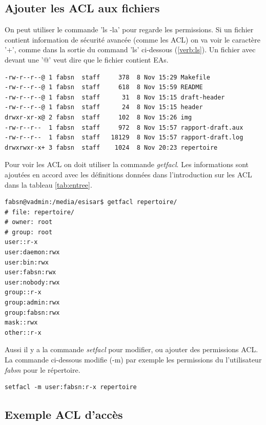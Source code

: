 \documentclass{article}
\begin{document}
\subsection*{Ajouter les ACL aux fichiers}

On peut utiliser le commande 'ls -la' pour regarde les permissions. Si un fichier contient information de sécurité avancée (comme les ACL) on va voir le caractère '+', comme dans la sortie du command 'ls' ci-dessous (\ref{verb:ls}). Un fichier avec devant une '@' veut dire que le fichier contient EAs. 

\begin{center}
\label{verb:ls}
\begin{verbatim}
-rw-r--r--@ 1 fabsn  staff     378  8 Nov 15:29 Makefile
-rw-r--r--@ 1 fabsn  staff     618  8 Nov 15:59 README
-rw-r--r--@ 1 fabsn  staff      31  8 Nov 15:15 draft-header
-rw-r--r--@ 1 fabsn  staff      24  8 Nov 15:15 header
drwxr-xr-x@ 2 fabsn  staff     102  8 Nov 15:26 img
-rw-r--r--  1 fabsn  staff     972  8 Nov 15:57 rapport-draft.aux
-rw-r--r--  1 fabsn  staff   18129  8 Nov 15:57 rapport-draft.log
drwxrwxr-x+ 3 fabsn  staff	  1024  8 Nov 20:23 repertoire
\end{verbatim}
\end{center}

Pour voir les ACL on doit utiliser la commande \emph{getfacl}. Les informations sont ajoutées en accord avec les définitions données dans l'introduction sur les ACL dans la tableau \ref{tab:entree}. 

\begin{verbatim}
fabsn@vadmin:/media/esisar$ getfacl repertoire/
# file: repertoire/
# owner: root
# group: root
user::r-x
user:daemon:rwx
user:bin:rwx
user:fabsn:rwx
user:nobody:rwx
group::r-x
group:admin:rwx
group:fabsn:rwx
mask::rwx
other::r-x	
\end{verbatim}

Aussi il y a la commande \emph{setfacl} pour modifier, ou ajouter des permissions ACL. La commande ci-dessous modifie (-m) par exemple les permissions du l'utilisateur \emph{fabsn} pour le répertoire. 

\begin{verbatim}
setfacl -m user:fabsn:r-x repertoire
\end{verbatim}

\subsection*{Exemple ACL d'accès}
\end{document}
